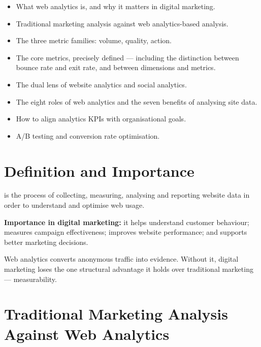 \documentclass{MMTextbook}
\begin{document}
\begin{learningoutcomes}
\begin{itemize}
\item What web analytics is, and why it matters in digital marketing.
\item Traditional marketing analysis against web analytics-based analysis.
\item The three metric families: volume, quality, action.
\item The core metrics, precisely defined --- including the distinction between
      bounce rate and exit rate, and between dimensions and metrics.
\item The dual lens of website analytics and social analytics.
\item The eight roles of web analytics and the seven benefits of analysing site
      data.
\item How to align analytics KPIs with organisational goals.
\item A/B testing and conversion rate optimisation.
\end{itemize}
\end{learningoutcomes}

\section{Definition and Importance}

\begin{definitionbox}
 is the process of collecting,
measuring, analysing and reporting website data in order to understand and
optimise web usage.
\end{definitionbox}

\noindent\textbf{Importance in digital marketing:} it helps understand customer
behaviour; measures campaign effectiveness; improves website performance; and
supports better marketing decisions.

\begin{keybox}
Web analytics converts anonymous traffic into evidence. Without it, digital
marketing loses the one structural advantage it holds over traditional
marketing --- measurability.
\end{keybox}

\section{Traditional Marketing Analysis Against Web Analytics}
\end{document}
